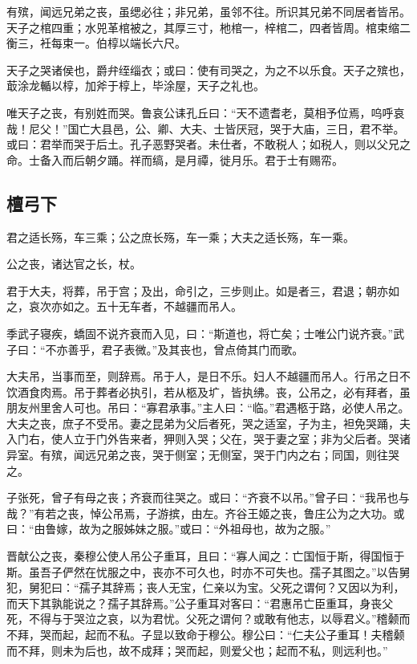 \documentclass[]{article}
\begin{document}
有殡，闻远兄弟之丧，虽缌必往；非兄弟，虽邻不往。所识其兄弟不同居者皆吊。天子之棺四重；水兕革棺被之，其厚三寸，杝棺一，梓棺二，四者皆周。棺束缩二衡三，衽每束一。伯椁以端长六尺。

天子之哭诸侯也，爵弁绖缁衣；或曰：使有司哭之，为之不以乐食。天子之殡也，菆涂龙輴以椁，加斧于椁上，毕涂屋，天子之礼也。

唯天子之丧，有别姓而哭。鲁哀公诔孔丘曰：``天不遗耆老，莫相予位焉，呜呼哀哉！尼父！''国亡大县邑，公、卿、大夫、士皆厌冠，哭于大庙，三日，君不举。或曰：君举而哭于后土。孔子恶野哭者。未仕者，不敢税人；如税人，则以父兄之命。士备入而后朝夕踊。祥而缟，是月禫，徙月乐。君于士有赐帟。

\hypertarget{header-n206}{%
\subsection{檀弓下}\label{header-n206}}

君之适长殇，车三乘；公之庶长殇，车一乘；大夫之适长殇，车一乘。

公之丧，诸达官之长，杖。

君于大夫，将葬，吊于宫；及出，命引之，三步则止。如是者三，君退；朝亦如之，哀次亦如之。五十无车者，不越疆而吊人。

季武子寝疾，蟜固不说齐衰而入见，曰：``斯道也，将亡矣；士唯公门说齐衰。''武子曰：``不亦善乎，君子表微。''及其丧也，曾点倚其门而歌。

大夫吊，当事而至，则辞焉。吊于人，是日不乐。妇人不越疆而吊人。行吊之日不饮酒食肉焉。吊于葬者必执引，若从柩及圹，皆执绋。丧，公吊之，必有拜者，虽朋友州里舍人可也。吊曰：``寡君承事。''主人曰：``临。''君遇柩于路，必使人吊之。大夫之丧，庶子不受吊。妻之昆弟为父后者死，哭之适室，子为主，袒免哭踊，夫入门右，使人立于门外告来者，狎则入哭；父在，哭于妻之室；非为父后者。哭诸异室。有殡，闻远兄弟之丧，哭于侧室；无侧室，哭于门内之右；同国，则往哭之。

子张死，曾子有母之丧；齐衰而往哭之。或曰：``齐衰不以吊。''曾子曰：``我吊也与哉？''有若之丧，悼公吊焉，子游摈，由左。齐谷王姬之丧，鲁庄公为之大功。或曰：``由鲁嫁，故为之服姊妹之服。''或曰：``外祖母也，故为之服。''

晋献公之丧，秦穆公使人吊公子重耳，且曰：``寡人闻之：亡国恒于斯，得国恒于斯。虽吾子俨然在忧服之中，丧亦不可久也，时亦不可失也。孺子其图之。''以告舅犯，舅犯曰：``孺子其辞焉；丧人无宝，仁亲以为宝。父死之谓何？又因以为利，而天下其孰能说之？孺子其辞焉。''公子重耳对客曰：``君惠吊亡臣重耳，身丧父死，不得与于哭泣之哀，以为君忧。父死之谓何？或敢有他志，以辱君义。''稽颡而不拜，哭而起，起而不私。子显以致命于穆公。穆公曰：``仁夫公子重耳！夫稽颡而不拜，则未为后也，故不成拜；哭而起，则爱父也；起而不私，则远利也。''
\end{document}
